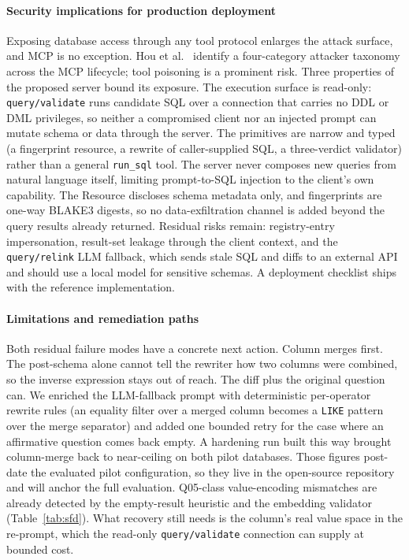 \documentclass[conference,10pt,a4paper]{IEEEtran}
\begin{document}
\paragraph*{Security implications for production deployment}
Exposing database access through any tool protocol enlarges the
attack surface, and MCP is no exception. Hou et al.~\cite{hou2025mcp}
identify a four-category attacker taxonomy across the MCP lifecycle;
tool poisoning is a prominent risk. Three properties of the proposed
server bound its exposure. The execution surface is read-only:
\texttt{query/validate} runs candidate SQL over a connection that
carries no DDL or DML privileges, so neither a compromised client nor
an injected prompt can mutate schema or data through the server. The
primitives are narrow and typed (a fingerprint resource, a rewrite of
caller-supplied SQL, a three-verdict validator) rather than a general
\texttt{run\_sql} tool. The server never composes new queries from natural language itself,
limiting prompt-to-SQL injection to the client's own capability. The Resource discloses schema metadata only, and fingerprints are
one-way BLAKE3 digests, so no data-exfiltration channel is added
beyond the query results already returned. Residual risks remain: registry-entry impersonation, result-set
leakage through the client context, and the \texttt{query/relink} LLM
fallback, which sends stale SQL and diffs to an external API and
should use a local model for sensitive schemas. A deployment checklist
ships with the reference implementation.

\paragraph*{Limitations and remediation paths}
Both residual failure modes have a concrete next action. Column
merges first. The post-schema alone cannot tell the rewriter how two
columns were combined, so the inverse expression stays out of reach.
The diff plus the original question can. We enriched the LLM-fallback
prompt with deterministic per-operator rewrite rules (an equality
filter over a merged column becomes a \texttt{LIKE} pattern over the
merge separator) and added one bounded retry for the case where an
affirmative question comes back empty. A hardening run built this way brought column-merge back to
near-ceiling on both pilot databases. Those figures post-date the
evaluated pilot configuration, so they live in the open-source
repository and will anchor the full evaluation. Q05-class
value-encoding mismatches are already detected by the empty-result
heuristic and the embedding validator (Table~\ref{tab:sfd}). What recovery still needs is the column's real value space in the
re-prompt, which the read-only \texttt{query/validate} connection can
supply at bounded cost.
\end{document}
